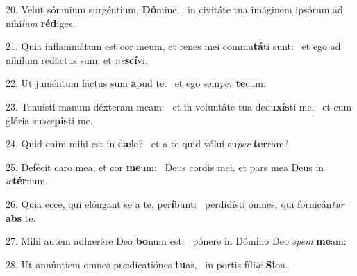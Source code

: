 20. Velut sómnium surgéntium, \textbf{Dó}mine, \ast\  in civitáte tua imáginem ipsórum ad níhi\textit{lum} \textbf{réd}iges.\

21. Quia inflammátum est cor meum, et renes mei commu\textbf{tá}ti sunt: \ast\  et ego ad níhilum redáctus sum, et \textit{ne}\textbf{scí}vi.\

22. Ut juméntum factus sum \textbf{a}pud te: \ast\  et ego sem\textit{per} \textbf{te}cum.\

23. Tenuísti manum déxteram meam: \dag\  et in voluntáte tua dedu\textbf{xís}ti me, \ast\  et cum glória su\textit{sce}\textbf{pís}ti me.\

24. Quid enim mihi est in \textbf{cæ}lo? \ast\  et a te quid vólui su\textit{per} \textbf{ter}ram?\

25. Defécit caro mea, et cor \textbf{me}um: \ast\  Deus cordis mei, et pars mea Deus in \textit{æ}\textbf{tér}num.\

26. Quia ecce, qui elóngant se a te, per\textbf{í}bunt: \ast\  perdidísti omnes, qui fornicán\textit{tur} \textbf{abs} te.\

27. Mihi autem adhærére Deo \textbf{bo}num est: \ast\  pónere in Dómino Deo \textit{spem} \textbf{me}am:\

28. Ut annúntiem omnes prædicatiónes \textbf{tu}as, \ast\  in portis fíli\textit{æ} \textbf{Si}on.\

